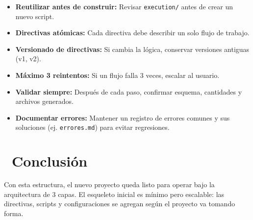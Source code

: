 \documentclass[11pt,a4paper]{article}
\newcommand{\iconotexto}[2]{\textcolor{cyanNeon}{\faIcon{#1}}~#2}
\begin{document}
\begin{tcolorbox}[cajaRecomendacion, title={Recomendaciones}]
\begin{itemize}[leftmargin=*]
    \item \textbf{Reutilizar antes de construir:} Revisar \texttt{execution/} antes de crear un nuevo script.
    \item \textbf{Directivas atómicas:} Cada directiva debe describir un solo flujo de trabajo.
    \item \textbf{Versionado de directivas:} Si cambia la lógica, conservar versiones antiguas (v1, v2).
    \item \textbf{Máximo 3 reintentos:} Si un flujo falla 3 veces, escalar al usuario.
    \item \textbf{Validar siempre:} Después de cada paso, confirmar esquema, cantidades y archivos generados.
    \item \textbf{Documentar errores:} Mantener un registro de errores comunes y sus soluciones (ej. \texttt{errores.md}) para evitar regresiones.
\end{itemize}
\end{tcolorbox}

\section[Conclusión]{\iconotexto{flag-checkered}{Conclusión}}

\begin{tcolorbox}[cajaFortaleza, title={Resultado}]
Con esta estructura, el nuevo proyecto queda listo para operar bajo la arquitectura de 3 capas. El esqueleto inicial es mínimo pero escalable: las directivas, scripts y configuraciones se agregan según el proyecto va tomando forma.
\end{tcolorbox}
\end{document}
